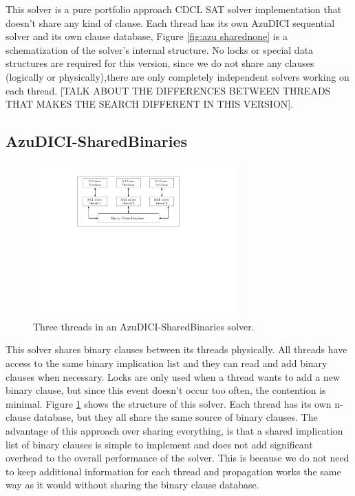 \documentclass[12pt]{diicc}
\begin{document}
This solver is a pure portfolio approach CDCL SAT solver implementation that doesn't share any kind of clause. Each thread has its own AzuDICI sequential solver and its own clause database, Figure \ref{fig:azu sharednone} is a schematization of the solver's internal structure. No locks or special data structures are required for this version, since we do not share any clauses (logically or physically),there are only completely independent solvers working on each thread. [TALK ABOUT THE DIFFERENCES BETWEEN THREADS THAT MAKES THE SEARCH DIFFERENT IN THIS VERSION].

\subsection{AzuDICI-SharedBinaries}

\begin{figure}[h!]
	\centering
		\includegraphics[width=0.7\textwidth]{sharedbinaries}
	\caption{Three threads in an AzuDICI-SharedBinaries solver.}
	\label{fig:azu sharedbinaries}
\end{figure}

This solver shares binary clauses between its threads physically. All threads have access to the same binary implication list and they can read and add binary clauses when necessary. Locks are only used when a thread wants to add a new binary clause, but since this event doesn't occur too often, the contention is minimal. Figure \ref{fig:azu sharedbinaries} shows the structure of this solver. Each thread has its own n-clause database, but they all share the same source of binary clauses. The advantage of this approach over sharing everything, is that a shared implication list of binary clauses is simple to implement and does not add significant overhead to the overall performance of the solver. This is because we do not need to keep additional information for each thread and propagation works the same way as it would without sharing the binary clause database.
\end{document}
